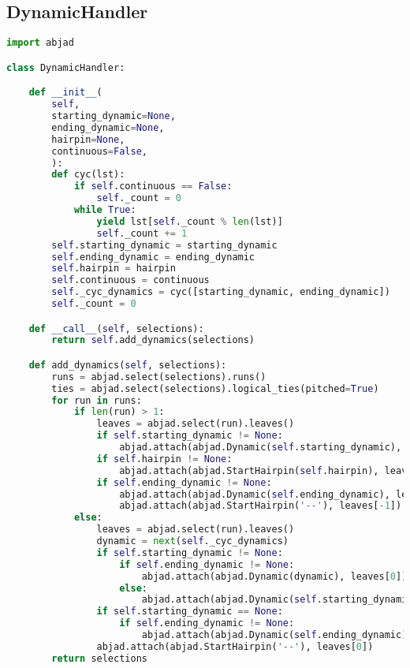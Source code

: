 \subsection{DynamicHandler}
\singlespace
\begin{lstlisting}[language=Python, caption=DynamicHandler]
import abjad

class DynamicHandler:

    def __init__(
        self,
        starting_dynamic=None,
        ending_dynamic=None,
        hairpin=None,
        continuous=False,
        ):
        def cyc(lst):
            if self.continuous == False:
                self._count = 0
            while True:
                yield lst[self._count % len(lst)]
                self._count += 1
        self.starting_dynamic = starting_dynamic
        self.ending_dynamic = ending_dynamic
        self.hairpin = hairpin
        self.continuous = continuous
        self._cyc_dynamics = cyc([starting_dynamic, ending_dynamic])
        self._count = 0

    def __call__(self, selections):
        return self.add_dynamics(selections)

    def add_dynamics(self, selections):
        runs = abjad.select(selections).runs()
        ties = abjad.select(selections).logical_ties(pitched=True)
        for run in runs:
            if len(run) > 1:
                leaves = abjad.select(run).leaves()
                if self.starting_dynamic != None:
                    abjad.attach(abjad.Dynamic(self.starting_dynamic), leaves[0])
                if self.hairpin != None:
                    abjad.attach(abjad.StartHairpin(self.hairpin), leaves[0])
                if self.ending_dynamic != None:
                    abjad.attach(abjad.Dynamic(self.ending_dynamic), leaves[-1])
                    abjad.attach(abjad.StartHairpin('--'), leaves[-1])
            else:
                leaves = abjad.select(run).leaves()
                dynamic = next(self._cyc_dynamics)
                if self.starting_dynamic != None:
                    if self.ending_dynamic != None:
                        abjad.attach(abjad.Dynamic(dynamic), leaves[0])
                    else:
                        abjad.attach(abjad.Dynamic(self.starting_dynamic), leaves[0])
                if self.starting_dynamic == None:
                    if self.ending_dynamic != None:
                        abjad.attach(abjad.Dynamic(self.ending_dynamic), leaves[0])
                abjad.attach(abjad.StartHairpin('--'), leaves[0])
        return selections
\end{lstlisting}
\doublespace

